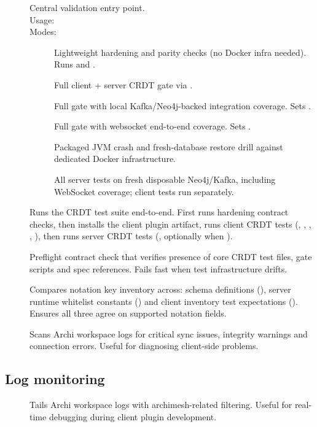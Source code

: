 \begin{description}
\item[]
  Central validation entry point.\\
  Usage: \\
  Modes:
  \begin{description}
  \item[] Lightweight hardening and parity checks (no Docker
    infra needed). Runs  and
    .
  \item[] Full client + server CRDT gate via
    .
  \item[] Full gate with local Kafka/Neo4j-backed integration
    coverage. Sets .
  \item[] Full gate with websocket end-to-end coverage. Sets
    .
  \item[] Packaged JVM crash and fresh-database restore drill
    against dedicated Docker infrastructure.
  \item[] All server tests on fresh disposable
    Neo4j/Kafka, including WebSocket coverage; client tests run separately.
  \end{description}

\item[]
  Runs the CRDT test suite end-to-end. First runs hardening contract checks,
  then installs the client plugin artifact, runs client CRDT tests
  (, ,
  , ,
  ), then runs server CRDT tests
  (, optionally
   when ).

\item[]
  Preflight contract check that verifies presence of core CRDT test files,
  gate scripts and spec references. Fails fast when test infrastructure
  drifts.

\item[]
  Compares notation key inventory across: schema definitions
  (), server runtime whitelist constants
  () and client inventory test expectations
  (). Ensures all three agree on
  supported notation fields.

\item[]
  Scans Archi workspace logs for critical sync issues, integrity warnings
  and connection errors. Useful for diagnosing client-side problems.
\end{description}

\subsection{Log monitoring}

\begin{description}
\item[]
  Tails Archi workspace logs with archimesh-related filtering. Useful for
  real-time debugging during client plugin development.
\end{description}
